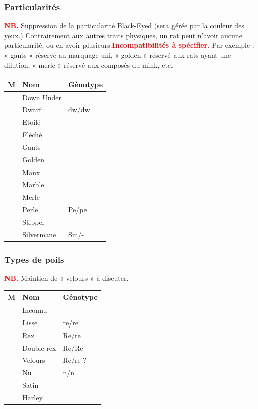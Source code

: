 \documentclass[a4paper,10pt]{article}
\newcommand\desire[1]{\noindent\textbf{\textcolor{red}{#1}}}
\begin{document}
\subsubsection{Particularités}
\desire{NB.} Suppression de la particularité Black-Eyed (sera gérée par la couleur des yeux.) Contrairement aux autres traits physiques, un rat peut n'avoir aucune particularité, ou en avoir plusieurs.\desire{Incompatibilités à spécifier.} Par exemple : « gants » réservé au marquage uni, « golden » réservé aux rats ayant une dilution, « merle » réservé aux composés du mink, etc.

\begin{longtable}{|c|l|l|}\hline
\textbf{M} & \textbf{Nom} & \textbf{Génotype} \\\hline
 &  Down Under & \\\hline
 &  Dwarf & dw/dw\\\hline
 &  Etoilé & \\\hline
 &  Fléché & \\\hline
 &  Gants & \\\hline
 &  Golden& \\\hline
 &  Manx& \\\hline
 &  Marble& \\\hline
 &  Merle& \\\hline
 &  Perle& Pe/pe\\\hline
 &  Stippel& \\\hline
 &  Silvermane& Sm/-\\\hline
\end{longtable}

\subsubsection{Types de poils}
\desire{NB.} Maintien de « velours » à discuter.
   
\begin{longtable}{|c|l|l|}\hline
\textbf{M} & \textbf{Nom} & \textbf{Génotype}\\\hline
 &  Inconnu &\\\hline
 &  Lisse & re/re \\\hline
 &  Rex & Re/re \\\hline
 &  Double-rex & Re/Re\\\hline
 &  Velours & Re/re ?\\\hline
 &  Nu & n/n \\\hline
 &  Satin & \\\hline
 &  Harley & \\\hline
\end{longtable}
\end{document}
